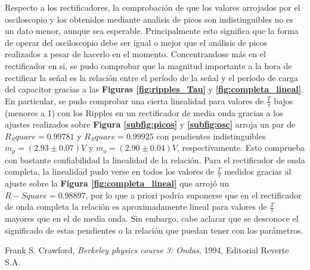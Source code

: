 \documentclass[11pt,a4paper]{article}
\begin{document}
Respecto a los rectificadores, la comprobación de que los valores arrojados por el osciloscopio y los obtenidos mediante analisis de picos son indistinguibles no es un dato menor, aunque sea esperable. Principalmente esto significa que
la forma de operar del osciloscopio debe ser igual o mejor que el análisis de picos realizados a pesar de hacerlo en el momento. Concentrandose más en el rectificador en si, se pudo comprobar que la magnitud importante a la hora de
rectificar la señal es la relación entre el período de la señal y el período de carga del capacitor gracias a las \textbf{Figuras \ref{fig:ripples_Tau}} y \textbf{\ref{fig:completa_lineal}}. En particular, se pudo comprobar una cierta
linealidad para valores de $\frac{T}{\tau}$ bajos (menores a 1) con los Ripples en un rectificador de media onda gracias a los ajustes realizados sobre \textbf{Figura \ref{subfig:picos}} y \textbf{\ref{subfig:osc}} arroja un par de 
$R_Square = 0.99781$ y $R_Square = 0.99925$ con pendientes indistinguibles $m_p = (2.93 \pm 0.07)V$ y $m_o = (2.90 \pm 0.04)V$, respectivamente. Esto comprueba con bastante confiabilidad la linealidad de la relación. Para el rectificador
de onda completa, la linealidad pudo verse en todos los valores de $\frac{T}{\tau}$ medidos gracias al ajuste sobre la \textbf{Figura \ref{fig:completa_lineal}} que arrojó un $R-Square = 0.98897$, por lo que a priori podría suponerse que en
el rectificador de onda completa la relación es aproximadamente lineal para valores de $\frac{T}{\tau}$ mayores que en el de media onda. Sin embargo, cabe aclarar que se desconoce el significado de estas pendientes o la relación que
puedan tener con los parámetros.
\label{sec:conclusiones}








\begin{thebibliography}{1}
  Frank S. Crawford, \textit{Berkeley physics course 3: Ondas}, 1994, Editorial Reverte S.A.
\end{thebibliography}
 
\end{document}

